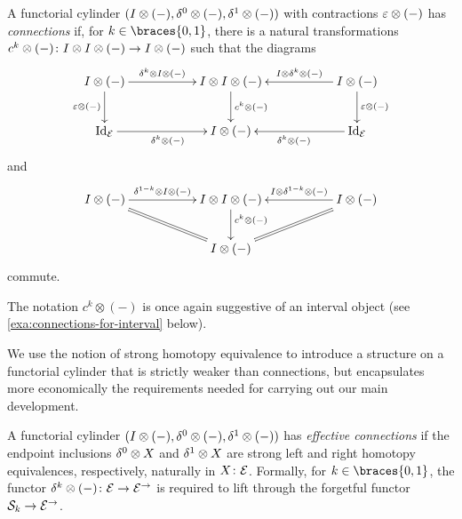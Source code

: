 \documentclass[reqno,10pt,a4paper,oneside,draft]{amsart}
\begin{document}
\begin{definition} \label{def:connections}
A functorial cylinder $(I \otimes (-), \delta^0 \otimes (-), \delta^1 \otimes (-))$ with contractions $\varepsilon \otimes (-)$ has \emph{connections} if, for $k \in \braces{0, 1}$, there is a natural transformations $c^k \otimes (-) \colon I \otimes I \otimes (-) \to I \otimes (-)$ such that the diagrams
\begin{equation} \label{connections:0}
\xymatrix@C+3em{
  \interval \otimes (-)
  \ar[r]^-{\kcyl \otimes \interval \otimes (-)}
  \ar[d]_{\ccyl \otimes (-)}
&
  \interval \otimes \interval \otimes (-)
  \ar[d]^{c^k \otimes (-)}
&
  \interval \otimes (-)
  \ar[l]_-{\interval \otimes \kcyl \otimes (-)}
  \ar[d]^{\ccyl \otimes (-)}
\\
  \Id_\catE
  \ar[r]_{\kcyl \otimes (-)}
&
  \interval \otimes (-)
&
  \Id_\catE
  \ar[l]^{\kcyl \otimes (-)}
}
\end{equation}
and
\begin{equation} \label{connections:1}
\xymatrix@C+3em{
  \interval \otimes (-)
  \ar[r]^-{\kcylinv \otimes \interval \otimes (-)}
  \ar@{=}[dr]
&
  \interval \otimes \interval \otimes (-)
  \ar[d]^(0.4){c^k \otimes (-)}
&
  \interval \otimes (-)
  \ar[l]_-{\interval \otimes \kcylinv \otimes (-)}
  \ar@{=}[dl]
\\&
  \interval \otimes (-)
}
\end{equation}
commute.
\end{definition}

The notation $c^k \otimes (-)$ is once again suggestive of an interval object (see \cref{exa:connections-for-interval} below).

We use the notion of strong homotopy equivalence to introduce a structure on a functorial cylinder that is strictly weaker than connections, but encapsulates more economically the requirements needed for carrying out our main development.

\begin{definition} \label{def:effective-connections}
A functorial cylinder $(I \otimes (-), \delta^0 \otimes (-), \delta^1 \otimes (-))$ has \emph{effective connections} if the endpoint inclusions $\delta^0 \otimes X$ and $\delta^1 \otimes X$ are strong left and right homotopy equivalences, respectively, naturally in $X \colon \mathcal{E}$.
Formally, for $k \in \braces{0, 1}$, the functor $\delta^k \otimes (-) \colon \mathcal{E} \to \mathcal{E}^\to$ is required to lift through the forgetful functor $\mathcal{S}_k \to \mathcal{E}^\to$.
\end{definition}
\end{document}
